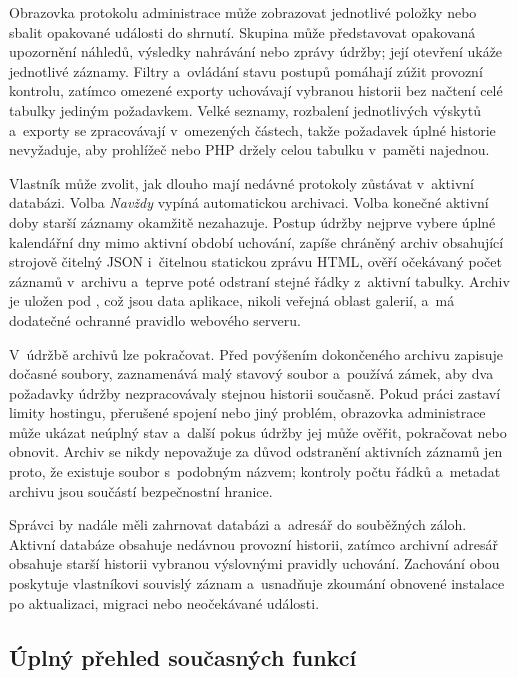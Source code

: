 \documentclass[11pt,a4paper]{article}
\newcommand{\filepath}[1]{\path{#1}}
\begin{document}
Obrazovka protokolu administrace může zobrazovat jednotlivé položky nebo sbalit
opakované události do shrnutí. Skupina může představovat opakovaná upozornění
náhledů, výsledky nahrávání nebo zprávy údržby; její otevření ukáže jednotlivé
záznamy. Filtry a~ovládání stavu postupů pomáhají zúžit provozní kontrolu,
zatímco omezené exporty uchovávají vybranou historii bez načtení celé tabulky
jediným požadavkem. Velké seznamy, rozbalení jednotlivých výskytů a~exporty se
zpracovávají v~omezených částech, takže požadavek úplné historie nevyžaduje, aby
prohlížeč nebo PHP držely celou tabulku v~paměti najednou.

Vlastník může zvolit, jak dlouho mají nedávné protokoly zůstávat v~aktivní
databázi. Volba \emph{Navždy} vypíná automatickou archivaci. Volba konečné
aktivní doby starší záznamy okamžitě nezahazuje. Postup údržby nejprve vybere
úplné kalendářní dny mimo aktivní období uchování, zapíše chráněný archiv
obsahující strojově čitelný JSON i~čitelnou statickou zprávu HTML, ověří
očekávaný počet záznamů v~archivu a~teprve poté odstraní stejné řádky z~aktivní
tabulky. Archiv je uložen pod \filepath{data/admin-log-archives/}, což jsou data
aplikace, nikoli veřejná oblast galerií, a~má dodatečné ochranné pravidlo
webového serveru.

V~údržbě archivů lze pokračovat. Před povýšením dokončeného archivu zapisuje
dočasné soubory, zaznamenává malý stavový soubor a~používá zámek, aby dva
požadavky údržby nezpracovávaly stejnou historii současně. Pokud práci zastaví
limity hostingu, přerušené spojení nebo jiný problém, obrazovka administrace
může ukázat neúplný stav a~další pokus údržby jej může ověřit, pokračovat nebo
obnovit. Archiv se nikdy nepovažuje za důvod odstranění aktivních záznamů jen
proto, že existuje soubor s~podobným názvem; kontroly počtu řádků a~metadat
archivu jsou součástí bezpečnostní hranice.

Správci by nadále měli zahrnovat databázi a~adresář
\filepath{data/admin-log-archives/} do souběžných záloh. Aktivní databáze
obsahuje nedávnou provozní historii, zatímco archivní adresář obsahuje starší
historii vybranou výslovnými pravidly uchování. Zachování obou poskytuje
vlastníkovi souvislý záznam a~usnadňuje zkoumání obnovené instalace po
aktualizaci, migraci nebo neočekávané události.
\subsection{Úplný přehled současných funkcí}
\label{sec:complete-feature-reference}
\end{document}
